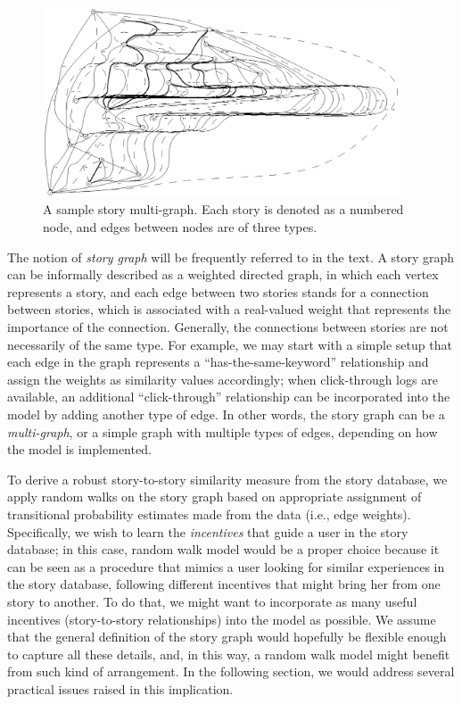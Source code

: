 \documentclass{article}[12pt]
\begin{document}
\begin{figure}[ht!] \centering \includegraphics[width=300pt]{storygraph.eps}
\caption{A sample story multi-graph.  Each story is denoted as a numbered node,
and edges between nodes are of three types.} \label{storygraph} \end{figure}

The notion of \emph{story graph} will be frequently referred to in the text.  A
story graph can be informally described as a weighted directed graph, in which
each vertex represents a story, and each edge between two stories stands for a
connection between stories, which is associated with a real-valued weight that
represents the importance of the connection.  Generally, the connections
between stories are not necessarily of the same type.  For example, we may
start with a simple setup that each edge in the graph represents a
``has-the-same-keyword'' relationship and assign the weights as similarity
values accordingly; when click-through logs are available, an additional
``click-through'' relationship can be incorporated into the model by adding
another type of edge.  In other words, the story graph can be a
\emph{multi-graph}, or a simple graph with multiple types of edges, depending on
how the model is implemented.  

To derive a robust story-to-story similarity measure from the story database,
we apply random walks on the story graph based on appropriate assignment of
transitional probability estimates made from the data (i.e., edge weights).
Specifically, we wish to learn the \emph{incentives} that guide a user in the
story database; in this case, random walk model would be a proper choice
because it can be seen as a procedure that mimics a user looking for similar
experiences in the story database, following different incentives that might
bring her from one story to another.  To do that, we might want to incorporate
as many useful incentives (story-to-story relationships) into the model as
possible.  We assume that the general definition of the story graph would
hopefully be flexible enough to capture all these details, and, in this way, a
random walk model might benefit from such kind of arrangement.  In the
following section, we would address several practical issues raised in this
implication.  
\end{document}
